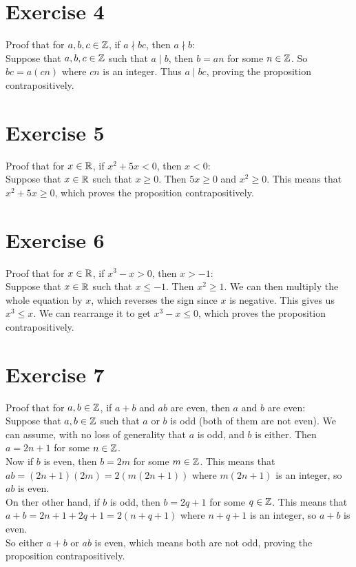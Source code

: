 \documentclass[12pt]{article}
\begin{document}
    \section*{Exercise 4}
    Proof that for $a, b, c \in \mathbb{Z}$,
    if $a \nmid bc$,
    then $a \nmid b$: \\
    Suppose that $a, b, c \in \mathbb{Z}$
    such that $a \mid b$,
    then $b = an$ for some $n \in \mathbb{Z}$.
    So $bc = a(cn)$ where $cn$ is an integer.
    Thus $a \mid bc$,
    proving the proposition contrapositively. \\

    \section*{Exercise 5}
    Proof that for $x \in \mathbb{R}$,
    if $x^2 + 5x < 0$,
    then $x < 0$: \\
    Suppose that $x \in \mathbb{R}$
    such that $x \geqslant 0$.
    Then $5x \geqslant 0$ and $x^2 \geqslant 0$.
    This means that $x^2 + 5x \geqslant 0$,
    which proves the proposition contrapositively. \\

    \section*{Exercise 6}
    Proof that for $x \in \mathbb{R}$,
    if $x^3 - x > 0$,
    then $x > -1$: \\
    Suppose that $x \in \mathbb{R}$
    such that $x \leqslant -1$.
    Then $x^2\geqslant 1$.
    We can then multiply the whole equation by $x$,
    which reverses the sign since $x$ is negative.
    This gives us $x^3 \leqslant x$.
    We can rearrange it to get $x^3 - x \leqslant 0$,
    which proves the proposition contrapositively. \\

    \section*{Exercise 7}
    Proof that for $a, b \in \mathbb{Z}$,
    if $a + b$ and $ab$ are even,
    then $a$ and $b$ are even: \\
    Suppose that $a, b \in \mathbb{Z}$
    such that $a$ or $b$ is odd
    (both of them are not even).
    We can assume, with no loss of generality
    that $a$ is odd, and $b$ is either.
    Then $a = 2n+1$ for some $n \in \mathbb{Z}$. \\
    Now if $b$ is even,
    then $b = 2m$ for some $m \in \mathbb{Z}$. 
    This means that $ab = (2n+1)(2m) = 2(m(2n+1))$
    where $m(2n+1)$ is an integer,
    so $ab$ is even. \\
    On ther other hand, if $b$ is odd,
    then $b = 2q + 1$ for some $q \in \mathbb{Z}$. 
    This means that $a + b = 2n+1 + 2q+1 = 2(n + q + 1)$
    where $n + q + 1$ is an integer,
    so $a + b$ is even. \\
    So either $a+b$ or $ab$ is even,
    which means both are not odd,
    proving the proposition contrapositively. \\
\end{document}
